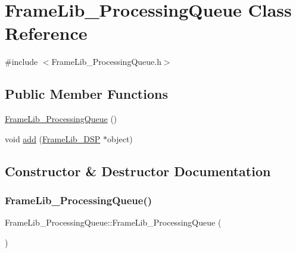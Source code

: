 \hypertarget{class_frame_lib___processing_queue}{}\section{Frame\+Lib\+\_\+\+Processing\+Queue Class Reference}
\label{class_frame_lib___processing_queue}


{\ttfamily \#include $<$Frame\+Lib\+\_\+\+Processing\+Queue.\+h$>$}

\subsection*{Public Member Functions}
\begin{DoxyCompactItemize}
\item 
\hyperlink{class_frame_lib___processing_queue_aebaf74090b8be2322111dec5e61de3a4}{Frame\+Lib\+\_\+\+Processing\+Queue} ()
\item 
void \hyperlink{class_frame_lib___processing_queue_add4ce0ad0a1cc32eb2df5522adea7e62}{add} (\hyperlink{class_frame_lib___d_s_p}{Frame\+Lib\+\_\+\+D\+SP} $\ast$object)
\end{DoxyCompactItemize}


\subsection{Constructor \& Destructor Documentation}
\mbox{\label{class_frame_lib___processing_queue_aebaf74090b8be2322111dec5e61de3a4}} 
\subsubsection{\texorpdfstring{Frame\+Lib\+\_\+\+Processing\+Queue()}{FrameLib\_ProcessingQueue()}}
{\footnotesize\ttfamily Frame\+Lib\+\_\+\+Processing\+Queue\+::\+Frame\+Lib\+\_\+\+Processing\+Queue (\begin{DoxyParamCaption}{ }\end{DoxyParamCaption})\hspace{0.3cm}{\ttfamily [inline]}}



